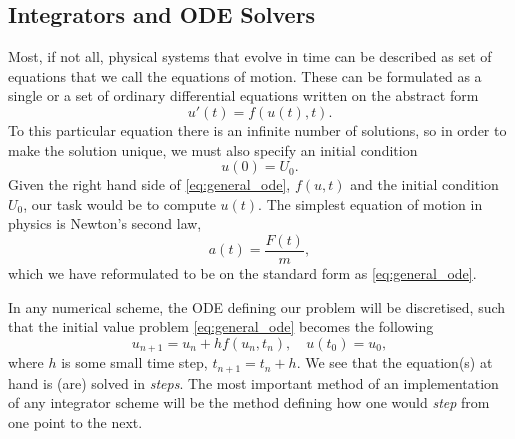 \subsection{Integrators and ODE Solvers}

    \begin{figure}
    
    \end{figure}

    Most, if not all, physical systems that evolve in time can be described 
    as set of equations that we call the equations of motion. These can 
    be formulated as a single or a set of ordinary differential equations written 
    on the abstract form
    \begin{equation}
        \label{eq:general_ode}
        u'(t) = f(u(t), t).
    \end{equation}
    To this particular equation there is an infinite number of solutions, so in order to
    make the solution unique, we must also specify an initial condition
    \begin{equation}
        u(0) = U_0.
    \end{equation}
    Given the right hand side of \autoref{eq:general_ode}, $f(u,t)$ and the initial
    condition $U_0$, our task would be to compute $u(t)$. The simplest equation of motion
    in physics is Newton's second law,
    \begin{equation}
        a(t) = \frac{F(t)}{m},
    \end{equation}
    which we have reformulated to be on the standard form as \autoref{eq:general_ode}.
 
    In any numerical scheme, the ODE defining our problem will be discretised, such 
    that the initial value problem \autoref{eq:general_ode} becomes the following 
    \begin{equation}
        u_{n+1} = u_n + hf(u_n, t_n), \quad u(t_0) = u_0,
    \end{equation}
    where $h$ is some small time step, $t_{n+1} = t_n + h$. We see that the equation(s) at 
    hand is (are) solved in \emph{steps}. The most important method of an implementation of any integrator 
    scheme will be the method defining how one would \emph{step} from one point to the next. 
 
